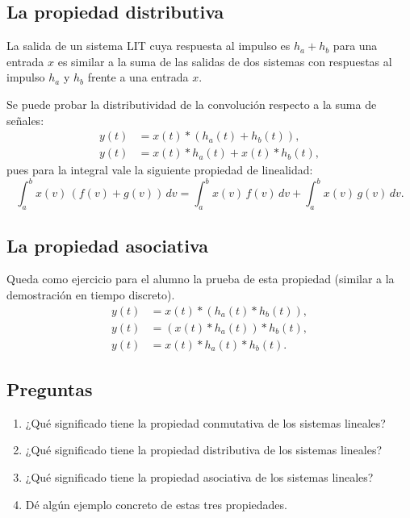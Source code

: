 \subsection{La propiedad distributiva}

La salida de un sistema LIT cuya respuesta al impulso es $h_{a} + h_{b}$ para una entrada $x$ es similar a la suma de las salidas de dos sistemas con respuestas al impulso $h_{a}$ y $h_{b}$ frente a una entrada $x$.

Se puede probar la distributividad de la convolución respecto a la suma de señales:
\begin{align}
	y(t) &= x(t) * \left( h_a(t) + h_{b}(t) \right) , \\
	y(t) &= x(t) * h_a(t) + x(t) * h_{b}(t),
\end{align}
pues para la integral vale la siguiente propiedad de linealidad:
\begin{equation}
	\int_{a}^{b} x(v) \, (f(v) + g(v)) \, dv = \int_{a}^{b} x(v) \, f(v) \, dv + \int_{a}^{b} x(v) \, g(v) \, dv.
\end{equation}

\subsection{La propiedad asociativa}

Queda como ejercicio para el alumno la prueba de esta propiedad (similar a la demostración en tiempo discreto).
\begin{align}
	y(t) &= x(t) * \left( h_a(t) * h_{b}(t) \right) , \\
	y(t) &= \left( x(t) * h_a(t) \right) * h_{b}(t) , \\
	y(t) &= x(t) * h_a(t) * h_{b}(t) .
\end{align}

\subsection{Preguntas}

\begin{enumerate}
	\item ¿Qué significado tiene la propiedad conmutativa de los sistemas lineales?
	\item ¿Qué significado tiene la propiedad distributiva de los sistemas lineales?
	\item ¿Qué significado tiene la propiedad asociativa de los sistemas lineales?
	\item Dé algún ejemplo concreto de estas tres propiedades.
\end{enumerate}

